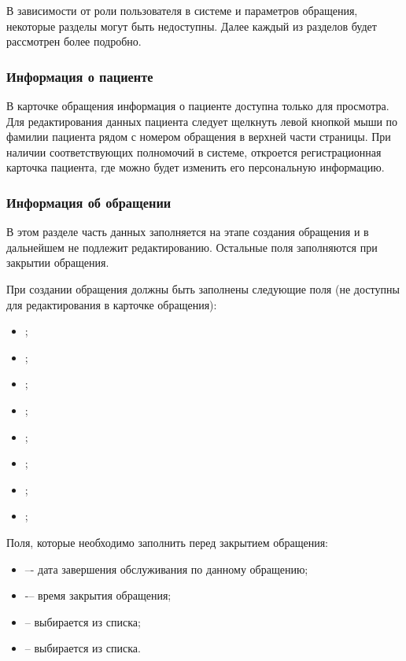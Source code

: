 В зависимости от роли пользователя в системе и параметров обращения, некоторые разделы могут быть недоступны. Далее каждый из разделов будет рассмотрен более подробно.

\subsubsection{Информация о пациенте}

В карточке обращения информация о пациенте доступна только для просмотра. Для редактирования данных пациента следует щелкнуть левой кнопкой мыши по фамилии пациента рядом с номером обращения в верхней части страницы. При наличии соответствующих полномочий в системе, откроется регистрационная карточка пациента, где можно будет изменить его персональную информацию. 

\subsubsection{Информация об обращении}

В этом разделе часть данных заполняется на этапе создания обращения и в дальнейшем не подлежит редактированию. Остальные поля заполняются при закрытии обращения. 

При создании обращения должны быть заполнены следующие поля (не доступны для редактирования в карточке обращения):
\begin{itemize}
  \item {};
  \item {};
  \item {};
  \item {};
  \item {};
  \item {};
  \item {};
  \item {};
\end{itemize}

Поля, которые необходимо заполнить перед закрытием обращения:
\begin{itemize}   
  \item {} –- дата завершения обслуживания по данному обращению;
  \item {} -– время закрытия обращения;
  \item {} -- выбирается из списка;
  \item {} -- выбирается из списка.
\end{itemize}

